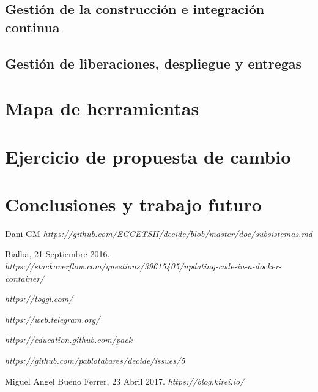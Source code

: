 \documentclass[12pt]{article}
\begin{document}
\subsection{Gestión de la construcción e integración continua}
\subsection{Gestión de liberaciones, despliegue y entregas}

\section{Mapa de herramientas}
\section{Ejercicio de propuesta de cambio}
\section{Conclusiones y trabajo futuro}

\newpage	


\begin{thebibliography}{9}
Dani GM
\textit
{https://github.com/EGCETSII/decide/blob/master/doc/subsistemas.md}

Bialba, 21 Septiembre 2016. 
\textit{https://stackoverflow.com/questions/39615405/updating-code-in-a-docker-container/}

\textit{https://toggl.com/}

\textit{https://web.telegram.org/}

\textit{https://education.github.com/pack}

\textit{https://github.com/pablotabares/decide/issues/5}


Miguel Angel Bueno Ferrer, 23 Abril 2017. 
\textit{https://blog.kirei.io/}





\end{thebibliography}
\end{document}
